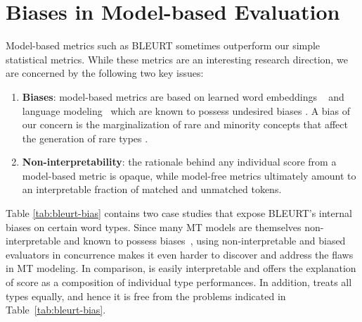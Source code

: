 

\section{Biases in Model-based Evaluation}
\label{sec:model-bias}

Model-based metrics such as BLEURT sometimes outperform our simple statistical metrics. 
While these metrics are an interesting research direction, we are concerned by the following two key issues:
\begin{enumerate}[noitemsep,topsep=0pt]
    \item \textbf{Biases}: model-based metrics are based on learned word embeddings ~\cite{kaiwei-NIPS2016-emb-bias} and language modeling~\cite{sheng-etal-2019-nlg-bias} which are known to possess undesired biases \cite{mehrabi2019survey-bias}. 
    A bias of our concern is the marginalization of rare and minority concepts that affect the generation of rare types \cite{gowda2020finding}.
    \item \textbf{Non-interpretability}: the rationale behind any individual score from a model-based metric is opaque, while model-free metrics ultimately amount to an interpretable fraction of matched and unmatched tokens. 
\end{enumerate}

Table \ref{tab:bleurt-bias} contains two case studies that expose BLEURT's internal biases on certain word types.
Since many MT models are themselves non-interpretable and known to possess biases~\cite{prates2019-mt-bias}, using non-interpretable and biased evaluators in concurrence makes it even harder to discover and address the flaws in MT modeling.
In comparison,  is easily interpretable and offers the explanation of score as a composition of individual type performances.
In addition,  treats all types equally, and hence it is free from the problems indicated in Table~\ref{tab:bleurt-bias}.

